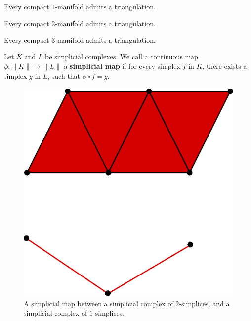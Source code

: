 \begin{theorem}\label{1.4.2}
    Every compact $1$-manifold admits a triangulation.
\end{theorem}

\begin{theorem}\label{1.4.3}
    Every compact $2$-manifold admits a triangulation.
\end{theorem}

\begin{theorem}\label{1.4.4}
    Every compact $3$-manifold admits a triangulation.
\end{theorem}

\begin{definition}
    Let $K$ and  $L$ be simplicial complexes. We call a continuous map
    $\phi:\|K\| \xrightarrow{} \|L\|$ a \textbf{simplicial map} if for every
    simplex $f$ in $K$, there exists  a simplex $g$ in  $L$, such that  $\phi
    \circ f=g$.
\end{definition}

\begin{figure}[h]
    \centering
    \includegraphics[scale=0.5]{Figures/Chapter1/simplicial_map.eps}
    \caption{A simplicial map between a simplicial complex of $2$-simplices, and
    a simplicial complex of  $1$-simplices.}
    \label{figure_1.12}
\end{figure}

